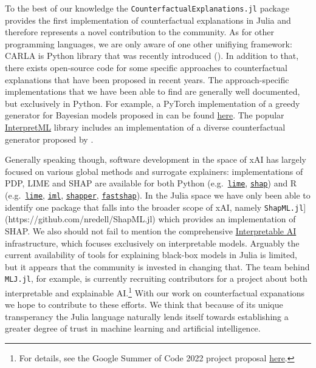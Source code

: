 \documentclass{juliacon}
\begin{document}
To the best of our knowledge the \texttt{CounterfactualExplanations.jl}
package provides the first implementation of counterfactual explanations
in Julia and therefore represents a novel contribution to the community.
As for other programming languages, we are only aware of one other
unifiying framework: CARLA is Python library that was recently
introduced (\cite{pawelczyk2021carla}). In addition to that, there
exists open-source code for some specific approaches to counterfactual
explanations that have been proposed in recent years. The
approach-specific implementations that we have been able to find are
generally well documented, but exclusively in Python. For example, a
PyTorch implementation of a greedy generator for Bayesian models
proposed in \cite{schut2021generating} can be found
\href{https://github.com/oscarkey/explanations-by-minimizing-uncertainty}{here}.
The popular \href{https://github.com/interpretml}{InterpretML} library
includes an implementation of a diverse counterfactual generator
proposed by \cite{mothilal2020explaining}.

Generally speaking though, software development in the space of xAI has
largely focused on various global methods and surrogate explainers:
implementations of PDP, LIME and SHAP are available for both Python
(e.g.~\href{https://github.com/marcotcr/lime}{\texttt{lime}},
\href{https://github.com/slundberg/shap}{\texttt{shap}}) and R
(e.g.~\href{https://cran.r-project.org/web/packages/lime/index.html}{\texttt{lime}},
\href{https://cran.r-project.org/web/packages/lime/index.html}{\texttt{iml}},
\href{https://modeloriented.github.io/shapper/}{\texttt{shapper}},
\href{https://github.com/bgreenwell/fastshap}{\texttt{fastshap}}). In
the Julia space we have only been able to identify one package that
falls into the broader scope of xAI, namely
\texttt{ShapML.jl}{]}(https://github.com/nredell/ShapML.jl) which
provides an implementation of SHAP. We also should not fail to mention
the comprehensive
\href{https://docs.interpretable.ai/stable/IAIBase/data/}{Interpretable
AI} infrastructure, which focuses exclusively on interpretable models.
Arguably the current availability of tools for explaining black-box
models in Julia is limited, but it appears that the community is
invested in changing that. The team behind \texttt{MLJ.jl}, for example,
is currently recruiting contributors for a project about both
interpretable and explainable AI.\footnote{For details, see the Google
  Summer of Code 2022 project proposal
  \href{https://julialang.org/jsoc/gsoc/MLJ/\#interpretable_machine_learning_in_julia}{here}.}
With our work on counterfactual expanations we hope to contribute to
these efforts. We think that because of its unique transperancy the
Julia language naturally lends itself towards establishing a greater
degree of trust in machine learning and artificial intelligence.
\end{document}
